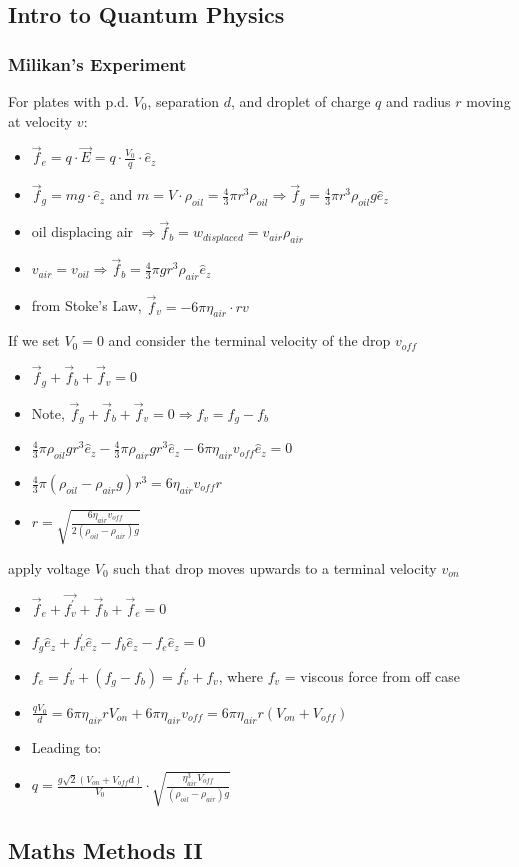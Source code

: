 \documentclass{article}
\begin{document}
\subsection{Intro to Quantum Physics}

\subsubsection*{Milikan's Experiment}
For plates with p.d. \(V_0\), separation \(d\),
and droplet of charge \(q\) and radius \(r\) moving at velocity \(v\):

\begin{itemize}
    \item \(\vec f_e = q\cdot\vec E = q\cdot\frac{V_0}{q}\cdot\hat e_z\)
    \item \(\vec f_g = mg\cdot\hat e_z\) and \(m=V\cdot \rho_{oil}=\frac{4}{3}\pi r^3\rho_{oil}\Rightarrow \vec f_g = \frac{4}{3}\pi r^3\rho_{oil} g\hat e_z \)
    \item oil displacing air \(\Rightarrow\vec f_b = w_{displaced}=v_{air}\rho_{air}\)
    \item \(v_{air} = v_{oil}\Rightarrow\vec f_b = \frac{4}{3}\pi g r^3\rho_{air}\hat e_z\)
    \item from Stoke's Law, \(\vec f_v = -6\pi\eta_{air}\cdot rv\)
\end{itemize}

If we set $V_0 = 0$ and consider the terminal velocity of the drop $v_{off}$
\begin{itemize}
    \item \(\vec f_g + \vec f_b + \vec f_v = 0\)
    \item Note, \(\vec f_g + \vec f_b + \vec f_v = 0 \Rightarrow f_v=f_g-f_b\)
    \item \(\frac{4}{3}\pi\rho_{oil}gr^3\hat e_z - \frac{4}{3}\pi\rho_{air}gr^3\hat e_z - 6\pi\eta_{air}v_{off}\hat e_z = 0\)
    \item \(\frac{4}{3}\pi(\rho_{oil}-\rho_{air}g)r^3=6\eta_{air}v_{off}r\)
    \item \(\boxed{r=\sqrt{\frac{6\eta_{air} v_{off}}{2(\rho_{oil}-\rho_{air})g}}}\)
\end{itemize}

apply voltage $V_0$ such that drop moves upwards to a terminal velocity \(v_{on}\)
\begin{itemize}
    \item \(\vec f_e + \vec{f_v^\prime} + \vec f_b + \vec f_e = 0\)
    \item \(f_g\hat e_z + f_v^\prime\hat e_z - f_b\hat e_z - f_e\hat e_z = 0\)
    \item \(f_e = f_v^\prime + (f_g - f_b) = f_v^\prime + f_v\), where \(f_v\) = viscous force from off case
    \item \(\frac{qV_0}{d} = 6\pi\eta_{air}rV_{on} + 6\pi\eta_{air}v_{off} = 6\pi\eta_{air}r(V_{on}+V_{off})\)
    \item Leading to: 
    \item \(\boxed{q=\frac{g\sqrt{2}(V_{on}+V_{off}d)}{V_0}\cdot\sqrt{\frac{\eta_{air}^3V_{off}}{(\rho_{oil}-\rho_{air})g}}}\)
\end{itemize}

\subsection{Maths Methods II}
\end{document}

